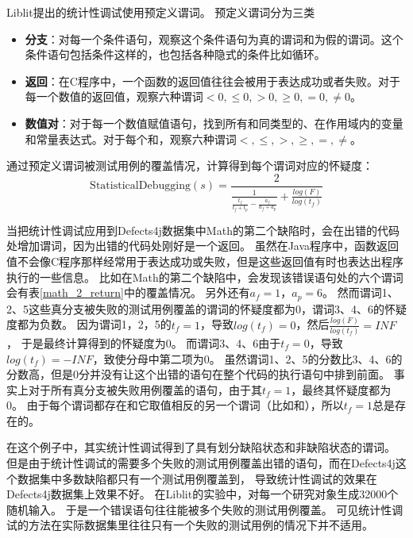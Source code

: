 Liblit\parencite{Liblit2005Scalable}提出的统计性调试使用预定义谓词。
预定义谓词分为三类
\begin{itemize}
\item \textbf{分支}：对每一个条件语句，观察这个条件语句为真的谓词和为假的谓词。这个条件语句包括条件这样的，也包括各种隐式的条件比如循环。
\item \textbf{返回}：在C程序中，一个函数的返回值往往会被用于表达成功或者失败。对于每一个数值的返回值，观察六种谓词$< 0, \le 0, > 0, \ge 0, = 0, \ne 0$。
\item \textbf{数值对}：对于每一个数值赋值语句，找到所有和同类型的、在作用域内的变量和常量表达式。对于每个和，观察六种谓词$<, \le, >, \ge, =, \ne$。
\end{itemize}
通过预定义谓词被测试用例的覆盖情况，计算得到每个谓词对应的怀疑度：
$$
\mathrm{StatisticalDebugging}(s) = \frac{2}{\frac{1}{\frac{t_f}{t_f + t_p} - \frac{a_f}{a_f + a_p}} + \frac{log(F)}{log(t_f)}}
$$

当把统计性调试应用到Defects4j数据集中Math的第二个缺陷时，会在出错的代码处增加谓词，因为出错的代码处刚好是一个返回。
虽然在Java程序中，函数返回值不会像C程序那样经常用于表达成功或失败，但是这些返回值有时也表达出程序执行的一些信息。
比如在Math的第二个缺陷中，会发现该错误语句处的六个谓词会有表\ref{math_2_return}中的覆盖情况。
另外还有$a_f = 1$，$a_p = 6$。
然而谓词1、2、5这些真分支被失败的测试用例覆盖的谓词的怀疑度都为0，谓词3、4、6的怀疑度都为负数。
因为谓词1，2，5的$t_f = 1$，导致$log(t_f) = 0$，然后$\frac{log(F)}{log(t_f)} = INF$，
于是最终计算得到的怀疑度为0。
而谓词3、4、6由于$t_f = 0$，导致$log(t_f) = -INF$，致使分母中第二项为0。
虽然谓词1、2、5的分数比3、4、6的分数高，但是0分并没有让这个出错的语句在整个代码的执行语句中排到前面。
事实上对于所有真分支被失败用例覆盖的语句，由于其$t_f = 1$，最终其怀疑度都为0。
由于每个谓词都存在和它取值相反的另一个谓词（比如和），所以$t_f = 1$总是存在的。

在这个例子中，其实统计性调试得到了具有划分缺陷状态和非缺陷状态的谓词。
但是由于统计性调试的需要多个失败的测试用例覆盖出错的语句，而在Defects4j这个数据集中多数缺陷都只有一个测试用例覆盖到，
导致统计性调试的效果在Defects4j数据集上效果不好。
在Liblit\parencite{Liblit2005Scalable}的实验中，对每一个研究对象生成32000个随机输入。
于是一个错误语句往往能被多个失败的测试用例覆盖。
可见统计性调试的方法在实际数据集里往往只有一个失败的测试用例的情况下并不适用。

